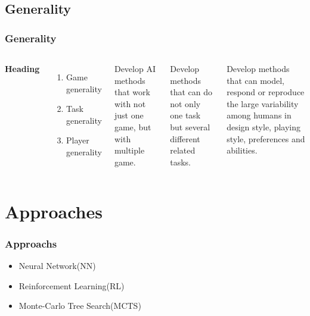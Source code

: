\documentclass{beamer}
\begin{document}
\subsection{Generality}
\begin{frame}
  \frametitle{Generality\cite{4}}
  \begin{columns}[c] %

    \textbf{Heading}
    \begin{enumerate}
      \item Game generality
      \item Task generality
      \item Player generality
    \end{enumerate}


    Develop AI methods that work with not just one game, but with multiple game.

    Develop methods that can do not only one task but several different related tasks.

    Develop methods that can model, respond or reproduce the large variability among humans in design style, playing style, preferences and abilities.
  \end{columns}
\end{frame}

\section{Approaches}
\begin{frame}
  \frametitle{Approachs}
  \begin{itemize}
    \item Neural Network(NN)
    \item Reinforcement Learning(RL)
    \item Monte-Carlo Tree Search(MCTS)
  \end{itemize}
\end{frame}
\end{document}
